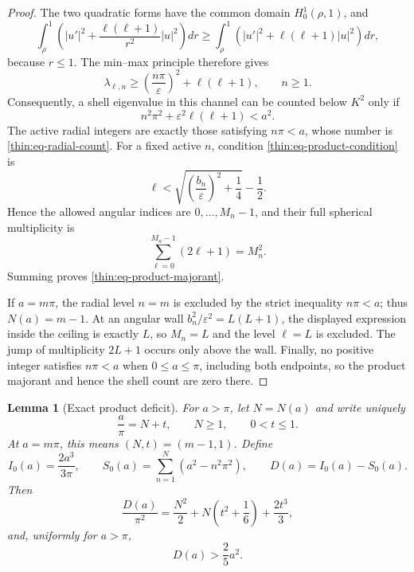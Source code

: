 \documentclass[11pt]{article}
\numberwithin{equation}{section}
\newtheorem{lemma}[theorem]{Lemma}
\theoremstyle{definition}
\theoremstyle{remark}
\begin{document}
\begin{proof}
The two quadratic forms have the common domain \(H_0^1(\rho,1)\), and
\[
  \int_\rho^1\left(
     |u'|^2+\frac{\ell(\ell+1)}{r^2}|u|^2
  \right)dr
  \geq
  \int_\rho^1\left(|u'|^2+\ell(\ell+1)|u|^2\right)dr,
\]
because \(r\leq1\).  The min--max principle therefore gives
\[
  \lambda_{\ell,n}
  \geq \left(\frac{n\pi}{\varepsilon}\right)^2
       +\ell(\ell+1),
  \qquad n\geq1.
\]
Consequently, a shell eigenvalue in this channel can be counted below
\(K^2\) only if
\begin{equation}
  n^2\pi^2+\varepsilon^2\ell(\ell+1)<a^2.
  \label{thin:eq-product-condition}
\end{equation}
The active radial integers are exactly those satisfying \(n\pi<a\), whose
number is \eqref{thin:eq-radial-count}.  For a fixed active \(n\), condition
\eqref{thin:eq-product-condition} is
\[
  \ell<
  \sqrt{\left(\frac{b_n}{\varepsilon}\right)^2+\frac14}-\frac12.
\]
Hence the allowed angular indices are
\(0,\ldots,M_n-1\), and their full spherical multiplicity is
\[
  \sum_{\ell=0}^{M_n-1}(2\ell+1)=M_n^2.
\]
Summing proves \eqref{thin:eq-product-majorant}.

If \(a=m\pi\), the radial level \(n=m\) is excluded by the strict
inequality \(n\pi<a\); thus \(N(a)=m-1\).  At an angular wall
\(b_n^2/\varepsilon^2=L(L+1)\), the displayed expression inside the ceiling
is exactly \(L\), so \(M_n=L\) and the level \(\ell=L\) is excluded.  The
jump of multiplicity \(2L+1\) occurs only above the wall.  Finally, no
positive integer satisfies \(n\pi<a\) when \(0\leq a\leq\pi\), including
both endpoints, so the product majorant and hence the shell count are zero
there.
\end{proof}

\begin{lemma}[Exact product deficit]
\label{thin:lem-product-deficit}
For \(a>\pi\), let \(N=N(a)\) and write uniquely
\begin{equation}
  \frac a\pi=N+t,
  \qquad N\geq1,
  \qquad 0<t\leq1.
  \label{thin:eq-strict-radial-parametrization}
\end{equation}
At \(a=m\pi\), this means \((N,t)=(m-1,1)\).  Define
\[
  I_0(a)=\frac{2a^3}{3\pi},
  \qquad
  S_0(a)=\sum_{n=1}^{N}(a^2-n^2\pi^2),
  \qquad
  D(a)=I_0(a)-S_0(a).
\]
Then
\begin{equation}
  \frac{D(a)}{\pi^2}
  =\frac{N^2}{2}+N\left(t^2+\frac16\right)+\frac{2t^3}{3},
  \label{thin:eq-deficit-identity}
\end{equation}
and, uniformly for \(a>\pi\),
\begin{equation}
  D(a)>\frac25a^2.
  \label{thin:eq-deficit-bound}
\end{equation}
\end{lemma}
\end{document}
